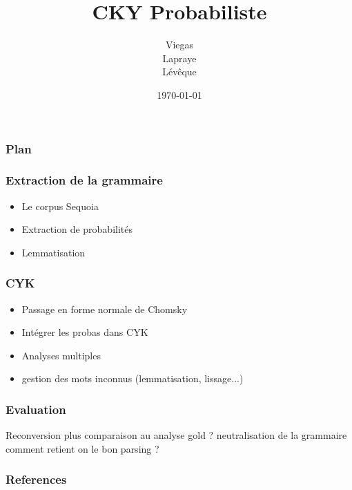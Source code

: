 \documentclass{beamer}
\begin{document}
\title{CKY Probabiliste}  %
\author{Viegas\\Lapraye\\Lévêque}

\date{\today}


\begin{frame}
 \maketitle
\end{frame}



\begin{frame} %
\frametitle{Plan}
\end{frame}

\begin{frame}
\frametitle{Extraction de la grammaire}

\begin{itemize}
 \item<1-3> Le corpus Sequoia
 \item<2-3> Extraction de probabilités
 \item<3-3> Lemmatisation
\end{itemize}

 
\end{frame}

\begin{frame}
 \frametitle{CYK}
 \begin{itemize}
  \item<1-3>{Passage en forme normale de Chomsky}
  \item<2-3>{Intégrer les probas dans CYK}
  \item<3>Analyses multiples
    
  \item<4> gestion des mots inconnus (lemmatisation, lissage...)
 
 \end{itemize}

 
\end{frame}

\begin{frame}
\frametitle{Evaluation}
 Reconversion plus comparaison au analyse gold
? neutralisation de la grammaire
comment retient on le bon parsing ?
\end{frame}



\begin{frame}[allowframebreaks]
        \frametitle{References}
\end{frame}

%
%
%
%
%
%
\end{document}
